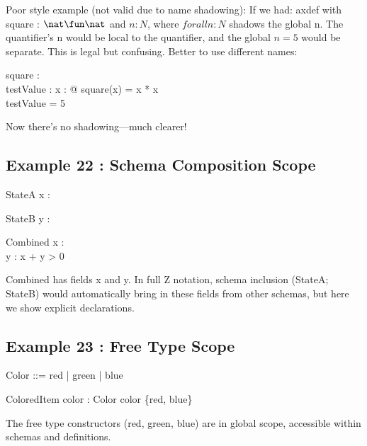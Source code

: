 \documentclass[a4paper,10pt,fleqn]{article}
\begin{document}
\noindent Poor style example (not valid due to name shadowing): If we had: axdef with square : $\nat \fun \nat$ and $n : N$, where $forall n : N$ shadows the global n. The quantifier's n would be local to the quantifier, and the global $n = 5$ would be separate. This is legal but confusing. Better to use different names:

\bigskip

\begin{axdef}
square : \nat \fun \nat \\
testValue : \nat
\where
\forall x : \nat @ square(x) = x * x \\
testValue = 5
\end{axdef}

\noindent Now there's no shadowing---much clearer!

\bigskip

\subsection*{Example 22 : Schema Composition Scope}

\begin{schema}{StateA}
x : \nat
\end{schema}

\begin{schema}{StateB}
y : \nat
\end{schema}

\begin{schema}{Combined}
x : \nat \\
y : \nat
\where
x + y > 0
\end{schema}

\noindent Combined has fields x and y. In full Z notation, schema inclusion (StateA; StateB) would automatically bring in these fields from other schemas, but here we show explicit declarations.

\bigskip

\subsection*{Example 23 : Free Type Scope}

\begin{zed}
Color ::= red | green | blue
\end{zed}

\begin{schema}{ColoredItem}
color : Color
\where
color \in \{red, blue\}
\end{schema}

\noindent The free type constructors (red, green, blue) are in global scope, accessible within schemas and definitions.

\bigskip
\end{document}
